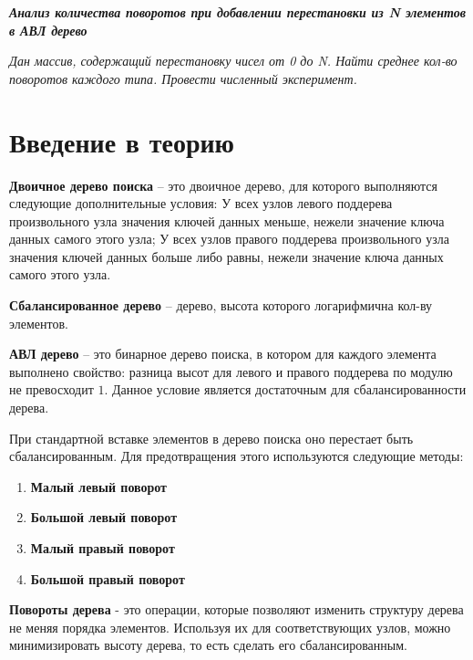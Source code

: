 \documentclass[a4paper,12pt] {report} 			%
\begin{document}
\setlength{\parskip}{4pt}

\begin{center}
	{\LARGE \bfseries \slshape Анализ количества поворотов при добавлении перестановки из N элементов в АВЛ дерево}
\end{center}

\textit
{
	Дан массив, содержащий перестановку чисел от 0 до N. Найти среднее кол-во поворотов каждого типа. Провести численный эксперимент.
}

\section{Введение в теорию}

{\bfseries Двоичное дерево поиска} -- это двоичное дерево, для которого выполняются следующие дополнительные условия: У всех узлов левого 
поддерева произвольного узла значения ключей данных меньше, нежели значение ключа данных самого этого узла; У всех узлов правого 
поддерева произвольного узла значения ключей данных больше либо равны, нежели значение ключа данных самого этого узла.

{\bfseries Сбалансированное дерево} -- дерево, высота которого логарифмична кол-ву элементов.

{\bfseries АВЛ дерево} -- это бинарное дерево поиска, в котором для каждого элемента выполнено свойство: разница высот для
левого и правого поддерева по модулю не превосходит $1$. Данное условие является достаточным для сбалансированности дерева.

При стандартной вставке элементов в дерево поиска оно перестает быть сбалансированным. Для предотвращения этого
используются следующие методы:

\begin{enumerate}
	\item {\bfseries Малый левый поворот}
	\item {\bfseries Большой левый поворот}
	\item {\bfseries Малый правый поворот}
	\item {\bfseries Большой правый поворот}
\end{enumerate}

{\bfseries Повороты дерева} - это операции, которые позволяют изменить структуру дерева не меняя порядка элементов. Используя их для 
соответствующих узлов, можно минимизировать высоту дерева, то есть сделать его сбалансированным.
\end{document}
